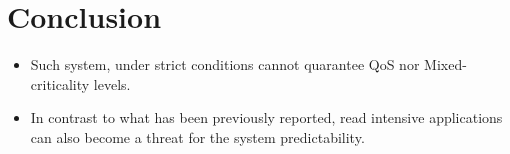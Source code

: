 \section{Conclusion}
    \begin{itemize}
        \item Such system, under strict conditions cannot quarantee QoS nor Mixed-criticality levels.
        \item In contrast to what has been previously reported, read intensive applications can also become a threat for the system predictability.
    \end{itemize}
